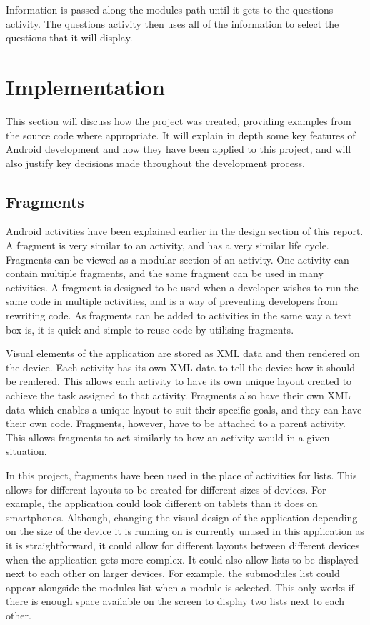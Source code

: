 \documentclass{article}
\begin{document}
Information is passed along the modules path until it gets to the questions activity. The questions activity then uses all of the information to select the questions that it will display. \par

\section{Implementation}
\label{section:implementation}

This section will discuss how the project was created, providing examples from the source code where appropriate. It will explain in depth some key features of Android development and how they have been applied to this project, and will also justify key decisions made throughout the development process. \par

\subsection{Fragments}

Android activities have been explained earlier in the design section of this report. A fragment is very similar to an activity, and has a very similar life cycle. Fragments can be viewed as a modular section of an activity. One activity can contain multiple fragments, and the same fragment can be used in many activities. A fragment is designed to be used when a developer wishes to run the same code in multiple activities, and is a way of preventing developers from rewriting code. As fragments can be added to activities in the same way a text box is, it is quick and simple to reuse code by utilising fragments. \par

Visual elements of the application are stored as XML data and then rendered on the device. Each activity has its own XML data to tell the device how it should be rendered. This allows each activity to have its own unique layout created to achieve the task assigned to that activity. Fragments also have their own XML data which enables a unique layout to suit their specific goals, and they can have their own code. Fragments, however, have to be attached to a parent activity. This allows fragments to act similarly to how an activity would in a given situation. \par

In this project, fragments have been used in the place of activities for lists. This allows for different layouts to be created for different sizes of devices. For example, the application could look different on tablets than it does on smartphones. Although, changing the visual design of the application depending on the size of the device it is running on is currently unused in this application as it is straightforward, it could allow for different layouts between different devices when the application gets more complex. It could also allow lists to be displayed next to each other on larger devices. For example, the submodules list could appear alongside the modules list when a module is selected. This only works if there is enough space available on the screen to display two lists next to each other. \par
\end{document}
